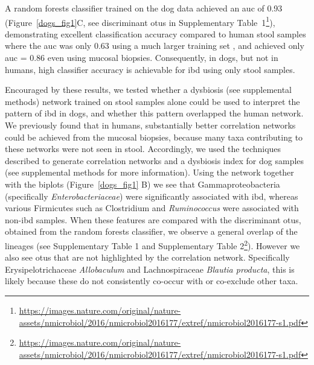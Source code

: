 A random forests classifier \cite{RN4205} trained on the dog data achieved an \gls{auc} of 0.93 (Figure~\ref{dogs_fig1}C, see discriminant \glspl{otu} in Supplementary Table~1\footnote{\url{https://images.nature.com/original/nature-assets/nmicrobiol/2016/nmicrobiol2016177/extref/nmicrobiol2016177-s1.pdf}}), demonstrating excellent classification accuracy compared to human stool samples where the \gls{auc} was only 0.63 using a much larger training set \cite{RN154}, and achieved only \gls{auc} = 0.86 even using mucosal biopsies. Consequently, in dogs, but not in humans, high classifier accuracy is achievable for \gls{ibd} using only stool samples.

Encouraged by these results, we tested whether a dysbiosis (see supplemental 
methods) network trained on stool samples alone could be used to interpret the 
pattern of \gls{ibd} in dogs, and whether this pattern overlapped the human 
network. We previously found that in humans, substantially better correlation 
networks could be achieved from the mucosal biopsies, because many taxa 
contributing to these networks were not seen in stool. Accordingly, we used the 
techniques described \cite{RN154} to generate correlation networks and a 
dysbiosis index for dog samples (see supplemental methods for more 
information). Using the network together with the biplots 
(Figure~\ref{dogs_fig1} B) we see that Gammaproteobacteria (specifically 
\textit{Enterobacteriaceae}) were significantly associated with \gls{ibd}, 
whereas various Firmicutes such as Clostridium and \textit{Ruminococcus} were 
associated with non-\gls{ibd} samples. When these features are compared with 
the discriminant \glspl{otu}, obtained from the random forests classifier, we 
observe a general overlap of the lineages (see Supplementary Table 1 and 
Supplementary Table 
2\footnote{\label{sup}\url{https://images.nature.com/original/nature-assets/nmicrobiol/2016/nmicrobiol2016177/extref/nmicrobiol2016177-s1.pdf}}).  
However we also see \glspl{otu} that are not highlighted by the correlation 
network. Specifically Erysipelotrichaceae \textit{Allobaculum} and 
Lachnospiraceae \textit{Blautia producta}, this is likely because these do not 
consistently co-occur with or co-exclude other taxa.


